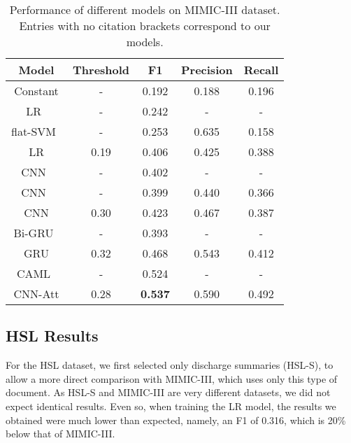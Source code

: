 \documentclass[runningheads]{llncs}
\begin{document}
\begin{table}[t]
	\centering
	\caption{Performance of different models on MIMIC-III dataset. Entries with no citation brackets correspond to our models.}
	\begin{tabular}{c|c|c|c|c}
		                         Model                           & Threshold &       F1       & Precision & Recall \\ \hline\hline
		                        Constant                         &     -     &     0.192      &   0.188   & 0.196  \\ \hline
		  LR~\cite{mullenbachExplainablePredictionMedical2018}   &     -     &     0.242      &     -     &   -    \\
		       flat-SVM~\cite{liAutomatedICD9Coding2019a}        &     -     &     0.253      &   0.635   & 0.158  \\
		                           LR                            &   0.19    &     0.406      &   0.425   & 0.388  \\ \hline
		 CNN~\cite{mullenbachExplainablePredictionMedical2018}   &     -     &     0.402      &     -     &   -    \\
		         CNN~\cite{liAutomatedICD9Coding2019a}           &     -     &     0.399      &   0.440   & 0.366  \\
		                          CNN                            &   0.30    &     0.423      &   0.467   & 0.387  \\ \hline
		Bi-GRU~\cite{mullenbachExplainablePredictionMedical2018} &     -     &     0.393      &     -     &   -    \\
		                          GRU                            &   0.32    &     0.468      &   0.543   & 0.412  \\ \hline
		 CAML~\cite{mullenbachExplainablePredictionMedical2018}  &     -     &     0.524      &     -     &   -    \\
		                        CNN-Att                          &   0.28    & \textbf{0.537} &   0.590   & 0.492
	\end{tabular}
	\label{tab:mimic_thresh_res}
\end{table}


\subsection{HSL Results}

For the HSL dataset, we first selected only discharge summaries (HSL-S), to allow a more direct comparison with MIMIC-III, which uses only this type of document. As HSL-S and MIMIC-III are very different datasets, we did not expect identical results. Even so, when training the LR model, the results we obtained were much lower than expected, namely, an F1 of 0.316, which is 20\% below that of MIMIC-III.
\end{document}
